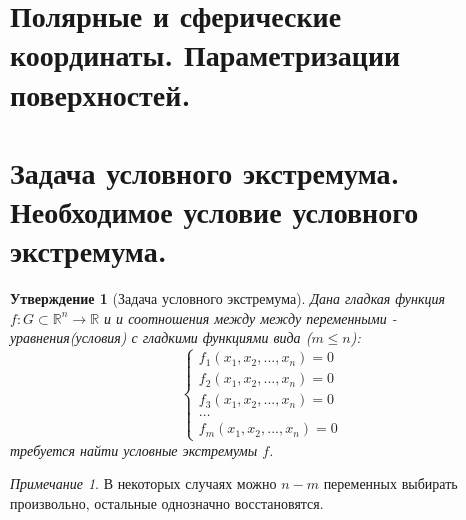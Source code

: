 \documentclass{article}
\theoremstyle{indented}
\newtheorem{stat}{Утверждение}
\theoremstyle{definition}
\theoremstyle{remark}
\newtheorem*{remark}{Примечание}
\begin{document}
\section{Полярные и сферические координаты. Параметризации поверхностей.}%


\section{Задача условного экстремума. Необходимое условие условного экстремума.}%


\begin{stat}[Задача условного экстремума]
    Дана гладкая функция $f: G\subset\mathbb{R}^n \to \mathbb{R}$ и
    и соотношения между между переменными - уравнения(условия) с гладкими функциями 
    вида ($m \leq n$):
    \[
        \begin{cases}
            f_1(x_1, x_2, ... , x_n) = 0 \\
            f_2(x_1, x_2, ... , x_n) = 0 \\
            f_3(x_1, x_2, ... , x_n) = 0 \\
            \dots                        \\
            f_m(x_1, x_2, ... , x_n) = 0 
        \end{cases}  
    \]
    требуется найти условные экстремумы $f$.
\end{stat}

\begin{remark}
    В некоторых случаях можно $n-m$ переменных выбирать произвольно, остальные однозначно восстановятся.
\end{remark}
\end{document}

